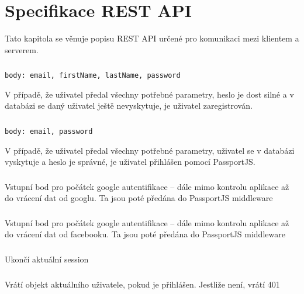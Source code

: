 \documentclass[a4paper,oneside,12pt]{report}
\begin{document}
\section{Specifikace REST API}
Tato kapitola se věnuje popisu REST API určené pro komunikaci mezi klientem a serverem.

\subsubsection{\color{apiblue}{POST -- /api/auth/register}}
\texttt{body: email, firstName, lastName, password} 

V případě, že uživatel předal všechny potřebné parametry, heslo je dost silné a v databázi se daný uživatel ještě nevyskytuje, je uživatel zaregistrován.

\subsubsection{\color{apiblue}{POST -- /api/auth/login}}
\texttt{body: email, password} 

V případě, že uživatel předal všechny potřebné parametry, uživatel se v databázi vyskytuje a heslo je správné, je uživatel přihlášen pomocí PassportJS.

\subsubsection{\color{apigreen}{GET -- /api/auth/google}}
Vstupní bod pro počátek google autentifikace -- dále mimo kontrolu aplikace až do vrácení dat od googlu. Ta jsou poté předána do PassportJS middleware

\subsubsection{\color{apigreen}{GET -- /api/auth/facebook}}
Vstupní bod pro počátek google autentifikace -- dále mimo kontrolu aplikace až do vrácení dat od facebooku. Ta jsou poté předána do PassportJS middleware

\subsubsection{\color{apiblue}{POST -- /api/auth/logout}}
Ukončí aktuální session

\subsubsection{\color{apigreen}{GET -- /api/user}}
Vrátí objekt aktuálního uživatele, pokud je přihlášen. Jestliže není, vrátí 401
\end{document}

